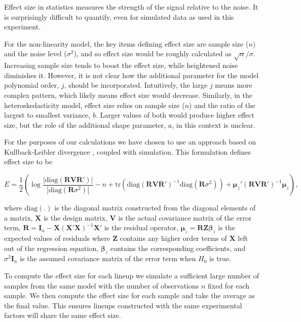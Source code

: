 \documentclass[]{interact}
\theoremstyle{plain}%
\theoremstyle{definition}
\theoremstyle{remark}
\begin{document}
Effect size in statistics measures the strength of the signal relative
to the noise. It is surprisingly difficult to quantify, even for
simulated data as used in this experiment.

For the non-linearity model, the key items defining effect size are
sample size (\(n\)) and the noise level (\(\sigma^2\)), and so effect
size would be roughly calculated as \(\sqrt{n}/{\sigma}\). Increasing
sample size tends to boost the effect size, while heightened noise
diminishes it. However, it is not clear how the additional parameter for
the model polynomial order, \(j\), should be incorporated. Intuitively,
the large \(j\) means more complex pattern, which likely means effect
size would decrease. Similarly, in the heteroskedasticity model, effect
size relies on sample size (\(n\)) and the ratio of the largest to
smallest variance, \(b\). Larger values of both would produce higher
effect size, but the role of the additional shape parameter, \(a\), in
this context is unclear.

For the purposes of our calculations we have chosen to use an approach
based on Kullback-Leibler divergence \citep{kullback1951information},
coupled with simulation. This formulation defines effect size to be

\vspace{-\baselineskip}

\[E = \frac{1}{2}\left(\log\frac{|\text{diag}(\boldsymbol{R}\boldsymbol{V}\boldsymbol{R}')|}{|\text{diag}(\boldsymbol{R}\sigma^2)|} - n + \text{tr}(\text{diag}(\boldsymbol{R}\boldsymbol{V}\boldsymbol{R}')^{-1}\text{diag}(\boldsymbol{R}\sigma^2)) + \boldsymbol{\mu}_z'(\boldsymbol{R}\boldsymbol{V}\boldsymbol{R}')^{-1}\boldsymbol{\mu}_z\right),\]

\noindent where \(\text{diag}(.)\) is the diagonal matrix constructed
from the diagonal elements of a matrix, \(\boldsymbol{X}\) is the design
matrix, \(\boldsymbol{V}\) is the actual covariance matrix of the error
term,
\(\boldsymbol{R} = \boldsymbol{I}_n - \boldsymbol{X}(\boldsymbol{X}'\boldsymbol{X})^{-1}\boldsymbol{X}'\)
is the residual operator,
\(\boldsymbol{\mu}_z = \boldsymbol{R}\boldsymbol{Z}\boldsymbol{\beta}_z\)
is the expected values of residuals where \(\boldsymbol{Z}\) contains
any higher order terms of \(\boldsymbol{X}\) left out of the regression
equation, \(\boldsymbol{\beta}_z\) contains the corresponding
coefficients, and \(\sigma^2\boldsymbol{I}_n\) is the assumed covariance
matrix of the error term when \(H_0\) is true.

To compute the effect size for each lineup we simulate a sufficient
large number of samples from the same model with the number of
observations \(n\) fixed for each sample. We then compute the effect
size for each sample and take the average as the final value. This
ensures lineups constructed with the same experimental factors will
share the same effect size.
\end{document}

